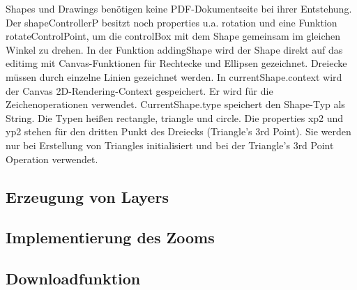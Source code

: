 \par
Shapes und Drawings benötigen keine PDF-Dokumentseite bei ihrer Entstehung. Der shapeControllerP besitzt noch properties u.a. rotation und eine Funktion rotateControlPoint, um die controlBox mit dem Shape gemeinsam im gleichen Winkel zu drehen. In der Funktion addingShape wird der Shape direkt auf das editimg mit Canvas-Funktionen für Rechtecke und Ellipsen gezeichnet. Dreiecke müssen durch einzelne Linien gezeichnet werden. In currentShape.context wird der Canvas 2D-Rendering-Context gespeichert. Er wird für die Zeichenoperationen verwendet. CurrentShape.type speichert den Shape-Typ als String. Die Typen heißen rectangle, triangle und circle. Die properties xp2 und yp2 stehen für den dritten Punkt des Dreiecks (Triangle's 3rd Point). Sie werden nur bei Erstellung von Triangles initialisiert und bei der Triangle's 3rd Point Operation verwendet.


\subsection{Erzeugung von Layers}
















\subsection{Implementierung des Zooms}

\subsection{Downloadfunktion}















